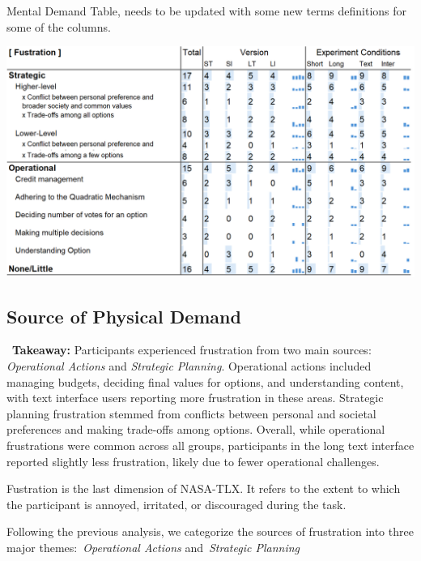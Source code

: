 \begin{table}[h]
    \caption{Mental Demand Table, needs to be updated with some new terms definitions for some of the columns.}
    \label{tbl:fustration}
    \includegraphics[width=\linewidth]{content/image/cog/fustration_table.png}
\end{table}
\subsection{Source of Physical Demand} 
\label{sec:fustration}

\vspace{5pt}
\begin{tldrbox}
    \faInfoCircle~\xspace\textbf{Takeaway:} Participants experienced frustration from two main sources: \textit{Operational Actions} and \textit{Strategic Planning}. Operational actions included managing budgets, deciding final values for options, and understanding content, with text interface users reporting more frustration in these areas. Strategic planning frustration stemmed from conflicts between personal and societal preferences and making trade-offs among options. Overall, while operational frustrations were common across all groups, participants in the long text interface reported slightly less frustration, likely due to fewer operational challenges.
\end{tldrbox}

Fustration is the last dimension of NASA-TLX. It refers to the extent to which the participant is annoyed, irritated, or discouraged during the task.

Following the previous analysis, we categorize the sources of frustration into three major themes:~\textit{Operational Actions} and~\textit{Strategic Planning}

